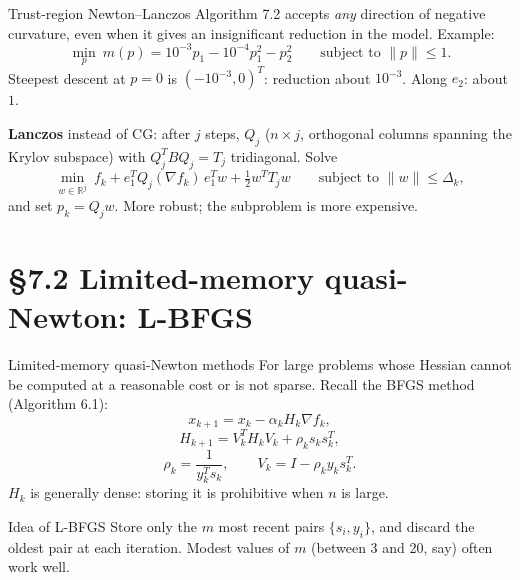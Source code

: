 \documentclass[aspectratio=169,12pt]{beamer}
\newcommand{\R}{\mathbb{R}}
\newcommand{\gradf}{\nabla f}
\begin{document}
\begin{frame}{Trust-region Newton--Lanczos}
  Algorithm 7.2 accepts \emph{any} direction of negative curvature, even when it gives an
  insignificant reduction in the model. Example:
  \[ \min_{p}\ m(p)=10^{-3}p_{1}-10^{-4}p_{1}^{2}-p_{2}^{2}\qquad\text{subject to }\|p\|\le 1 . \]
  Steepest descent at $p=0$ is $(-10^{-3},0)^{T}$: reduction about $10^{-3}$. Along $e_{2}$: about $1$.

  \vspace{0.3em}
  \textbf{Lanczos} instead of CG: after $j$ steps, $Q_{j}$ ($n\times j$, orthogonal columns spanning
  the Krylov subspace) with $Q_{j}^{T}BQ_{j}=T_{j}$ tridiagonal. Solve
  \[
    \min_{w\in\R^{j}}\ f_{k}+e_{1}^{T}Q_{j}(\gradf_{k})\,e_{1}^{T}w+\tfrac12w^{T}T_{j}w
    \qquad\text{subject to }\|w\|\le\Delta_{k} ,
    \tag{7.14}
  \]
  and set $p_{k}=Q_{j}w$. More robust; the subproblem is more expensive.
\end{frame}

\section{\S7.2 Limited-memory quasi-Newton: L-BFGS}

\begin{frame}{Limited-memory quasi-Newton methods}
  For large problems whose Hessian cannot be computed at a reasonable cost or is not
  sparse. Recall the BFGS method (Algorithm 6.1):
  \[ x_{k+1}=x_{k}-\alpha_{k}H_{k}\gradf_{k}, \tag{7.15} \]
  \[ H_{k+1}=V_{k}^{T}H_{k}V_{k}+\rho_{k}s_{k}s_{k}^{T}, \tag{7.16} \]
  \[ \rho_{k}=\frac{1}{y_{k}^{T}s_{k}},\qquad V_{k}=I-\rho_{k}y_{k}s_{k}^{T} . \tag{7.17} \]
  $H_{k}$ is generally dense: storing it is prohibitive when $n$ is large.

  \begin{block}{Idea of L-BFGS}
    Store only the \alert{$m$ most recent pairs} $\{s_{i},y_{i}\}$, and discard the oldest pair at each
    iteration. Modest values of $m$ (between 3 and 20, say) often work well.
  \end{block}
\end{frame}
\end{document}
